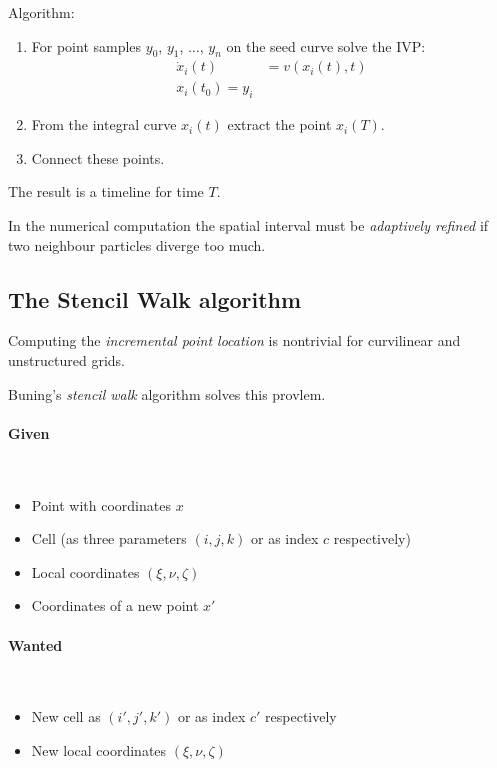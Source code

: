 Algorithm:
\begin{enumerate}
    \item For point samples $y_0$, $y_1$, $\ldots$, $y_n$ on the seed curve solve the IVP:
        \begin{align*}
            \dot x_i (t) &= v(x_i(t),t)\\
            x_i(t_0) = y_i
        \end{align*}
    \item From the integral curve $x_i(t)$ extract the point $x_i(T)$.
    \item Connect these points.
\end{enumerate}
The result is a timeline for time $T$.

In the numerical computation the spatial interval must be \emph{adaptively refined} if two neighbour particles diverge too much.


\subsection{The Stencil Walk algorithm}
Computing the \emph{incremental point location} is nontrivial for curvilinear and unstructured grids.

Buning's \emph{stencil walk} algorithm solves this provlem.

\paragraph{Given}$\ $
\begin{itemize}
    \item Point with coordinates $x$
    \item Cell (as three parameters $(i,j,k)$ or as index $c$ respectively)
    \item Local coordinates $(\xi, \nu, \zeta)$
    \item Coordinates of a new point $x'$
\end{itemize}
\paragraph{Wanted} $\ $
\begin{itemize}
    \item New cell as $(i',j', k')$ or as index $c'$ respectively
    \item New local coordinates $(\xi, \nu, \zeta)$
\end{itemize}

